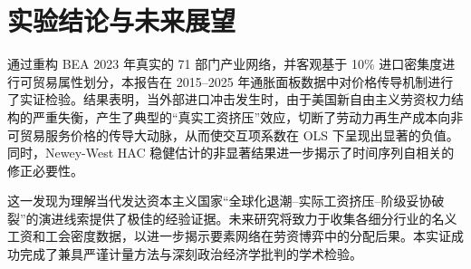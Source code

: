\documentclass[UTF8,a4paper,11pt]{ctexart}
\begin{document}
\section{实验结论与未来展望}
通过重构 BEA 2023 年真实的 71 部门产业网络，并客观基于 10\% 进口密集度进行可贸易属性划分，本报告在 2015--2025 年通胀面板数据中对价格传导机制进行了实证检验。结果表明，当外部进口冲击发生时，由于美国新自由主义劳资权力结构的严重失衡，产生了典型的“真实工资挤压”效应，切断了劳动力再生产成本向非可贸易服务价格的传导大动脉，从而使交互项系数在 OLS 下呈现出显著的负值。同时，Newey-West HAC 稳健估计的非显著结果进一步揭示了时间序列自相关的修正必要性。

这一发现为理解当代发达资本主义国家“全球化退潮--实际工资挤压--阶级妥协破裂”的演进线索提供了极佳的经验证据。未来研究将致力于收集各细分行业的名义工资和工会密度数据，以进一步揭示要素网络在劳资博弈中的分配后果。本实证成功完成了兼具严谨计量方法与深刻政治经济学批判的学术检验。
\end{document}
